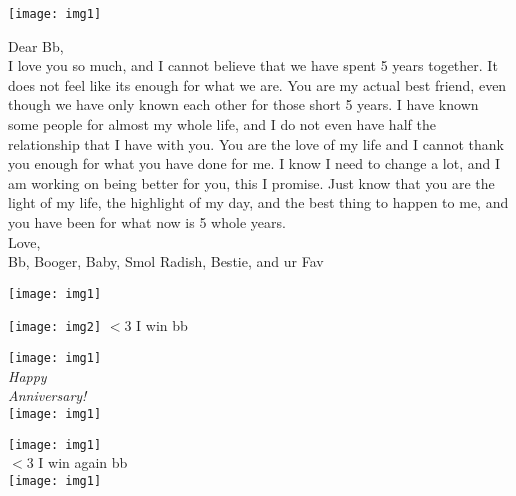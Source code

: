\documentclass[12 pt]{article}
\begin{document}
\begin{frontcover}
  \begin{center}
    \texttt{[image: img1]}
  \end{center}
  Dear Bb,\\
  I love you so much, and I cannot believe that we have spent 5 years together. It does not feel like its enough for what we are. You are my actual best friend, even though we have only known each other for those short 5 years. I have known some people for almost my whole life, and I do not even have half the relationship that I have with you. You are the love of my life and I cannot thank you enough for what you have done for me. I know I need to change a lot, and I am working on being better for you, this I promise. Just know that you are the light of my life, the highlight of my day, and the best thing to happen to me, and you have been for what now is 5 whole years. \\
  Love,\\
  Bb, Booger, Baby, Smol Radish, Bestie, and ur Fav
  \vfill
  \begin{center}
    \texttt{[image: img1]}
  \end{center}  
\end{frontcover}
\begin{backcover}
  \centering
  \vfill
  \texttt{[image: img2]}
  \small
  $<3$ I win bb 
  \vspace{0.5 cm}
\end{backcover}

\begin{insideright}
  \centering
  \texttt{[image: img1]}\\
  \vfill
  \Large\textit{Happy \\ Anniversary!}\\
  \vspace{5cm}
  \texttt{[image: img1]}
\end{insideright}

\begin{insideleft}
  \centering
  \texttt{[image: img1]}\\
  \vfill
  $<3$ I win again bb\\
  \texttt{[image: img1]}\\
\end{insideleft}
\end{document}
